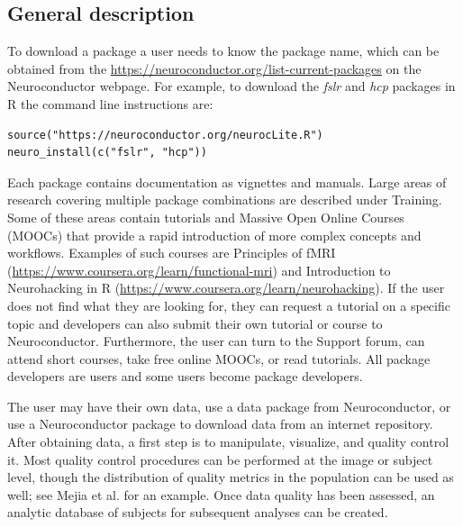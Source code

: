 \documentclass[]{elsarticle} %
\newcommand{\pkg}[1]{\emph{#1}}
\begin{document}
\subsection{General description}\label{subsec:general_description}
To download a package a user needs to know the package name, which can be obtained from the \href{list of packages}{https://neuroconductor.org/list-current-packages} on the Neuroconductor webpage. For example, to download the \pkg{fslr} and \pkg{hcp} packages in R the command line instructions are: 

\color{blue}
\begin{verbatim}
source("https://neuroconductor.org/neurocLite.R") 
neuro_install(c("fslr", "hcp"))
\end{verbatim}
\color{black}

Each package contains documentation as vignettes and manuals. Large areas of research covering multiple package combinations are described under Training. Some of these areas contain tutorials and Massive  Open Online Courses (MOOCs) that provide a rapid introduction of more complex concepts and workflows. Examples of such courses are Principles of fMRI  (\url{https://www.coursera.org/learn/functional-mri}) and Introduction to Neurohacking in R (\url{https://www.coursera.org/learn/neurohacking}).  If the user does not find what they are looking for, they can request a tutorial on a specific topic and developers can also submit their own tutorial or course to Neuroconductor. Furthermore, the user can turn to the Support forum,  can attend short courses, take free online MOOCs, or read tutorials. All package developers are users and some users become package developers.

The user may have their own data, use a data package from Neuroconductor, or use a Neuroconductor package  to download data from an internet repository.  
After obtaining data, a first step is to manipulate, visualize, and quality control it.  Most quality control procedures can be performed at the image or subject level, though the distribution of quality metrics in the population can be used as well; see Mejia et al. \citep{mejia2015pca} for an example. Once data quality has been assessed, an analytic database of subjects for subsequent analyses can be created.   
\end{document}
